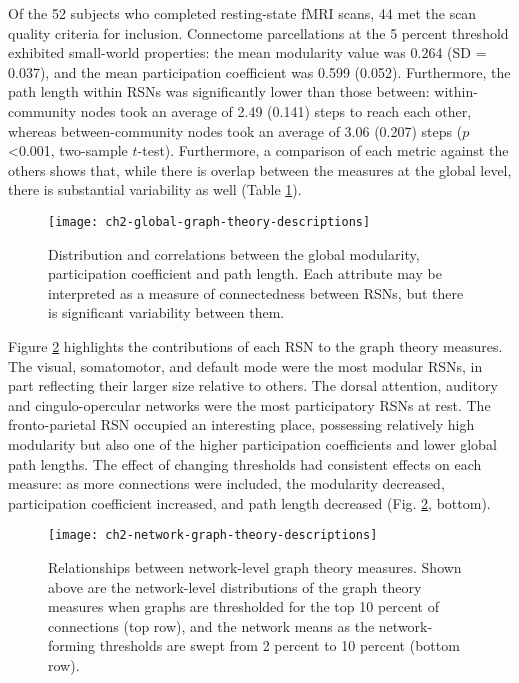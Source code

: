 Of the 52 subjects who completed resting-state fMRI scans, 44 met the scan quality criteria for inclusion. Connectome parcellations at the 5 percent threshold exhibited small-world properties: the mean modularity value was 0.264 (SD = 0.037), and the mean participation coefficient was 0.599 (0.052). Furthermore, the path length within RSNs was significantly lower than those between: within-community nodes took an average of 2.49 (0.141) steps to reach each other, whereas between-community nodes took an average of 3.06 (0.207) steps ($p$ \textless 0.001, two-sample $t$-test). Furthermore, a comparison of each metric against the others shows that, while there is overlap between the measures at the global level, there is substantial variability as well (Table \ref{fig:ch2-global-graph-theory-descriptions}).

\begin{figure}[t]
    \centering
    \texttt{[image: ch2-global-graph-theory-descriptions]}
    \caption[Distribution and correlations between global graph theory measures.]{Distribution and correlations between the global modularity, participation coefficient and path length. Each attribute may be interpreted as a measure of connectedness between RSNs, but there is significant variability between them.}
    \label{fig:ch2-global-graph-theory-descriptions}
\end{figure}

Figure \ref{fig:ch2-network-graph-theory-descriptions} highlights the contributions of each RSN to the graph theory measures. The visual, somatomotor, and default mode were the most modular RSNs, in part reflecting their larger size relative to others. The dorsal attention, auditory and cingulo-opercular networks were the most participatory RSNs at rest. The fronto-parietal RSN occupied an interesting place, possessing relatively high modularity but also one of the higher participation coefficients and lower global path lengths. The effect of changing thresholds had consistent effects on each measure: as more connections were included, the modularity decreased, participation coefficient increased, and path length decreased (Fig.  \ref{fig:ch2-network-graph-theory-descriptions}, bottom). 

\begin{figure}[t]
    \centering
    \texttt{[image: ch2-network-graph-theory-descriptions]}
    \caption[Relationships between network-level graph theory measures.]{Relationships between network-level graph theory measures. Shown above are the network-level distributions of the graph theory measures when graphs are thresholded for the top 10 percent of connections (top row), and the network means as the network-forming thresholds are swept from 2 percent to 10 percent (bottom row).}
    \label{fig:ch2-network-graph-theory-descriptions}
\end{figure}


